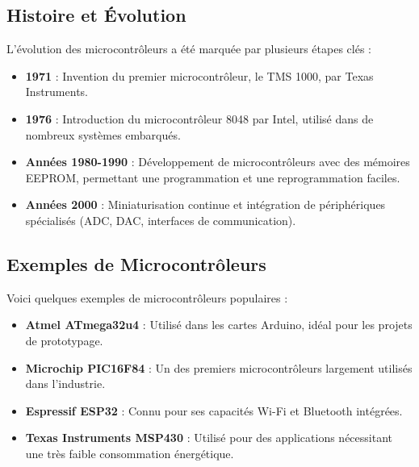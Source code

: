 \documentclass[10pt,a4paper]{article}
\begin{document}

\subsection*{Histoire et Évolution}

L'évolution des microcontrôleurs a été marquée par plusieurs étapes clés :
\begin{itemize}
    \item \textbf{1971} : Invention du premier microcontrôleur, le TMS 1000, par Texas Instruments.
    \item \textbf{1976} : Introduction du microcontrôleur 8048 par Intel, utilisé dans de nombreux systèmes embarqués.
    \item \textbf{Années 1980-1990} : Développement de microcontrôleurs avec des mémoires EEPROM, permettant une programmation et une reprogrammation faciles.
    \item \textbf{Années 2000} : Miniaturisation continue et intégration de périphériques spécialisés (ADC, DAC, interfaces de communication).
\end{itemize}


\subsection*{Exemples de Microcontrôleurs}

Voici quelques exemples de microcontrôleurs populaires :
\begin{itemize}
    \item \textbf{Atmel ATmega32u4} : Utilisé dans les cartes Arduino, idéal pour les projets de prototypage.
    \item \textbf{Microchip PIC16F84} : Un des premiers microcontrôleurs largement utilisés dans l'industrie.
    \item \textbf{Espressif ESP32} : Connu pour ses capacités Wi-Fi et Bluetooth intégrées.
    \item \textbf{Texas Instruments MSP430} : Utilisé pour des applications nécessitant une très faible consommation énergétique.
\end{itemize}
\end{document}
